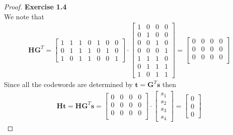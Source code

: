 \documentclass[11pt]{article}
\theoremstyle{definition}
\begin{document}
\cleardoublepage
\begin{proof}{\textbf{Exercise 1.4}}\\
We note that
\begin{align*}
    \mathbf{H}\mathbf{G}^T
    = \begin{bmatrix}
        1 & 1 & 1 & 0 & 1 & 0 & 0 \\
        0 & 1 & 1 & 1 & 0 & 1 & 0 \\
        1 & 0 & 1 & 1 & 0 & 0 & 1
    \end{bmatrix}
    \cdot \begin{bmatrix}
        1 & 0 & 0 & 0 \\
        0 & 1 & 0 & 0 \\
        0 & 0 & 1 & 0 \\
        0 & 0 & 0 & 1 \\
        1 & 1 & 1 & 0 \\
        0 & 1 & 1 & 1 \\
        1 & 0 & 1 & 1
    \end{bmatrix}
    = \begin{bmatrix}
        0 & 0 & 0 & 0 \\
        0 & 0 & 0 & 0 \\
        0 & 0 & 0 & 0 \\
    \end{bmatrix}
\end{align*}
Since all the codewords are determined by $\mathbf{t} = \mathbf{G}^T\mathbf{s}$
then
\begin{align*}
    \mathbf{H}\mathbf{t} = \mathbf{H}\mathbf{G}^T\mathbf{s}
    = \begin{bmatrix}
        0 & 0 & 0 & 0 \\
        0 & 0 & 0 & 0 \\
        0 & 0 & 0 & 0 \\
    \end{bmatrix}
    \cdot \begin{bmatrix}
        s_1 \\ s_2 \\ s_3 \\ s_4    
    \end{bmatrix}
    = \begin{bmatrix}
        0 \\ 0 \\ 0
    \end{bmatrix}
\end{align*}
\end{proof}
\end{document}
